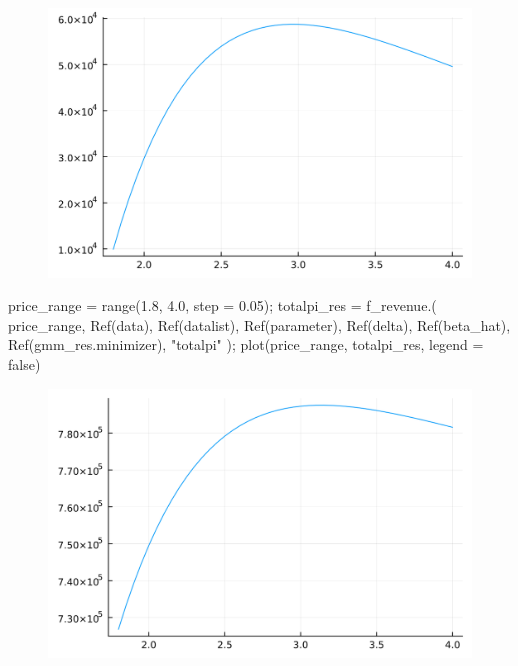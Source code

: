 \documentclass[
  letterpaper,
  DIV=11,
  numbers=noendperiod]{scrreprt}
\newenvironment{Shaded}{\begin{snugshade}}{\end{snugshade}}
\newcommand{\ConstantTok}[1]{\textcolor[rgb]{0.56,0.35,0.01}{#1}}
\newcommand{\FloatTok}[1]{\textcolor[rgb]{0.68,0.00,0.00}{#1}}
\newcommand{\FunctionTok}[1]{\textcolor[rgb]{0.28,0.35,0.67}{#1}}
\newcommand{\NormalTok}[1]{\textcolor[rgb]{0.00,0.23,0.31}{#1}}
\newcommand{\OperatorTok}[1]{\textcolor[rgb]{0.37,0.37,0.37}{#1}}
\newcommand{\StringTok}[1]{\textcolor[rgb]{0.13,0.47,0.30}{#1}}
\begin{document}
\begin{figure}[H]

{\centering \includegraphics{./demand_estimation_2_files/figure-pdf/cell-23-output-1.svg}

}

\end{figure}

\begin{Shaded}
\begin{Highlighting}[]
\NormalTok{price\_range }\OperatorTok{=} \FunctionTok{range}\NormalTok{(}\FloatTok{1.8}\NormalTok{, }\FloatTok{4.0}\NormalTok{, step }\OperatorTok{=} \FloatTok{0.05}\NormalTok{);}
\NormalTok{totalpi\_res }\OperatorTok{=} \FunctionTok{f\_revenue}\NormalTok{.(}
\NormalTok{    price\_range, }
    \FunctionTok{Ref}\NormalTok{(data), }\FunctionTok{Ref}\NormalTok{(datalist), }\FunctionTok{Ref}\NormalTok{(parameter), }\FunctionTok{Ref}\NormalTok{(delta), }\FunctionTok{Ref}\NormalTok{(beta\_hat), }\FunctionTok{Ref}\NormalTok{(gmm\_res.minimizer),}
    \StringTok{"totalpi"}
\NormalTok{);}
\FunctionTok{plot}\NormalTok{(price\_range, totalpi\_res, legend }\OperatorTok{=} \ConstantTok{false}\NormalTok{)}
\end{Highlighting}
\end{Shaded}

\begin{figure}[H]

{\centering \includegraphics{./demand_estimation_2_files/figure-pdf/cell-24-output-1.svg}

}

\end{figure}
\end{document}
